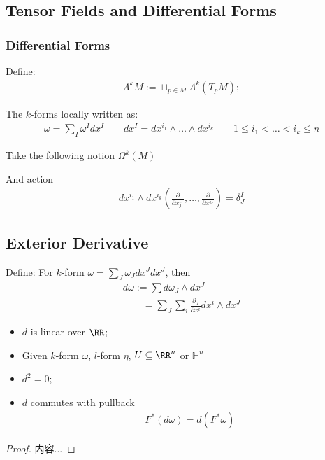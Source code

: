 \documentclass[Total.tex]{subfiles}
\begin{document}
			\subsection{Tensor Fields and Differential Forms}
				\subsubsection{Differential Forms}
					\begin{Def}
						Define:
						\begin{gather*}
							\Lambda^k M:=\sqcup_{p\in M} \Lambda^k(T_p M);
						\end{gather*}
						
						The $k$-forms locally written as:
						\begin{gather*}
							\omega=\sum_I \omega^I dx^I\qquad dx^I=dx^{i_1}\wedge\dots\wedge dx^{i_k}\qquad 1\leq i_1<\dots<i_k\leq n
						\end{gather*}
						
						Take the following notion $\Omega^k(M)$
					\end{Def}
					
					And action
					\begin{gather*}
						dx^{i_1}\wedge dx^{i_k}(\frac{\partial}{\partial x_{j_1}},\dots,\frac{\partial}{\partial x^{i_k}})=\delta^I_J
					\end{gather*}
					
			\subsection{Exterior Derivative}
				\begin{Def}
					Define: For $k$-form $\omega=\sum_J \omega_J dx^J dx^J$, then 
					\begin{gather*}
						d\omega:=\sum d\omega_J\wedge dx^J\\
						\qquad=\sum_J \sum_{i} \frac{\partial_J}{\partial x^i}dx^i\wedge dx^J
					\end{gather*}
				\end{Def}
				
				\begin{proposition}
					\begin{itemize}
						\item $d$ is linear over $\RR$;
						\item Given $k$-form $\omega$, $l$-form $\eta$, $U\subseteq \RR^n$ or $\mathbb{H}^n$
						\item $d^2=0$;
						\item $d$ commutes with pullback
						\begin{gather*}
							F^*(d\omega)=d(F^*\omega)
						\end{gather*}
					\end{itemize}
				\end{proposition}
				\begin{proof}
					内容...
				\end{proof}
				
\end{document}
